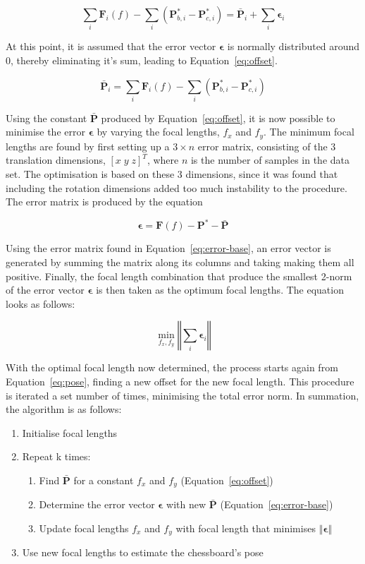 \[
  \sum\limits_i \bm{F}_i(f) - \sum\limits_i(\bm{P}^*_{b,i} - \bm{P}^*_{c, i}) = \bar{\bm{P}}_{i} + \sum\limits_i\bm{\epsilon}_i
\]

At this point, it is assumed that the error vector $\bm{\epsilon}$ is normally distributed around $0$, thereby eliminating it's sum, leading to Equation~\ref{eq:offset}.

\begin{equation}
  \label{eq:offset}
  \bar{\bm{P}}_{i} = \sum\limits_i \bm{F}_i(f) - \sum\limits_i(\bm{P}^*_{b,i} - \bm{P}^*_{c, i})
\end{equation}

Using the constant $\bar{\bm{P}}$ produced by Equation~\ref{eq:offset}, it is now possible to minimise the error $\bm{\epsilon}$ by varying the focal lengths, $f_x$ and $f_y$. The minimum focal lengths are found by first setting up a $3\times n$ error matrix, consisting of the 3 translation dimensions, ${[x\;y\;z]}^T$, where $n$ is the number of samples in the data set. The optimisation is based on these 3 dimensions, since it was found that including the rotation dimensions added too much instability to the procedure. The error matrix is produced by the equation

\begin{equation}
  \label{eq:error-base}
  \bm{\epsilon} = \bm{F}(f) - \bm{P}^* - \bar{\bm{P}}
\end{equation}

Using the error matrix found in Equation~\ref{eq:error-base}, an error vector is generated by summing the matrix along its columns and taking making them all positive. Finally, the focal length combination that produce the smallest 2-norm of the error vector $\bm{\epsilon}$ is then taken as the optimum focal lengths. The equation looks as follows:

\[
  \min_{f_x, f_y}\left \Vert \sum_i  \bm{\epsilon}_i \right \Vert
\]

With the optimal focal length now determined, the process starts again from Equation~\ref{eq:pose}, finding a new offset for the new focal length. This procedure is iterated a set number of times, minimising the total error norm. In summation, the algorithm is as follows:

\begin{enumerate}
  \item Initialise focal lengths
  \item Repeat k times:
  \begin{enumerate}
    \item Find $\bar{\bm{P}}$ for a constant $f_x$ and $f_y$ (Equation~\ref{eq:offset})
      \item Determine the error vector $\bm{\epsilon}$ with new $\bar{\bm{P}}$ (Equation~\ref{eq:error-base})
    \item Update focal lengths $f_x$ and $f_y$ with focal length that minimises $\left \Vert \bm{\epsilon} \right \Vert$
  \end{enumerate}
  \item Use new focal lengths to estimate the chessboard's pose
\end{enumerate}

